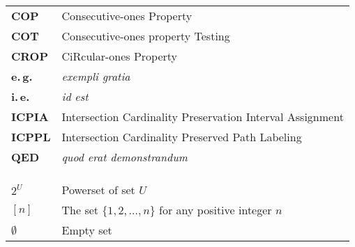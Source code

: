 \xclearpage

\abbreviations

\begin{tabular}{ll}
  \textbf{COP}& Consecutive-ones Property \\
  \textbf{COT}& Consecutive-ones property Testing \\
  \textbf{CROP}& CiRcular-ones Property \\
  \textbf{e.\,g.}& {\em exempli gratia} \\ 
  \textbf{i.\,e.}& {\em id est}\\
  \textbf{ICPIA}& Intersection Cardinality Preservation Interval
  Assignment \\
  \textbf{ICPPL}& Intersection Cardinality Preserved Path Labeling \\ 
  \textbf{QED}& {\em quod erat demonstrandum}\\

  &\\
  \hline
  &\\
  &\\
  $2^{U}$  & Powerset of set $U$\\
  $[n]$   & The set $\{1,2,\ldots,n\}$ for any positive integer $n$\\
  $\emptyset$ & Empty set
  
\end{tabular}